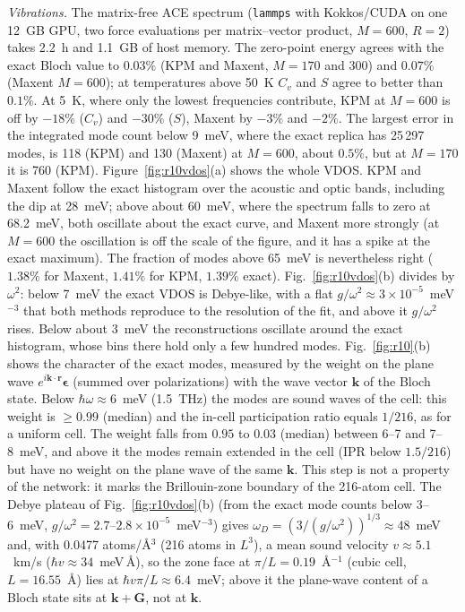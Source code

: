 \documentclass[reprint,nofootinbib,superscriptaddress,amsmath,amssymb,aps,prb,floatfix]{revtex4-2}
\begin{document}
\emph{Vibrations.} The matrix-free ACE spectrum (\texttt{lammps} with Kokkos/CUDA on one 12~GB GPU, two force evaluations per matrix--vector product, $M=600$, $R=2$) takes 2.2~h and 1.1~GB of host memory. The zero-point energy agrees with the exact Bloch value to $0.03\%$ (KPM and Maxent, $M=170$ and 300) and $0.07\%$ (Maxent $M=600$); at temperatures above 50~K $C_v$ and $S$ agree to better than $0.1\%$. At 5~K, where only the lowest frequencies contribute, KPM at $M=600$ is off by $-18\%$ ($C_v$) and $-30\%$ ($S$), Maxent by $-3\%$ and $-2\%$.
The largest error in the integrated mode count below 9~meV, where the exact replica has 25\,297 modes, is 118 (KPM) and 130 (Maxent) at $M=600$, about $0.5\%$, but at $M=170$ it is 760 (KPM).
Figure~\ref{fig:r10vdos}(a) shows the whole VDOS. KPM and Maxent follow the exact histogram over the acoustic and optic bands, including the dip at 28~meV; above about 60~meV, where the spectrum falls to zero at 68.2~meV, both oscillate about the exact curve, and Maxent more strongly (at $M=600$ the oscillation is off the scale of the figure, and it has a spike at the exact maximum). The fraction of modes above 65~meV is nevertheless right ($1.38\%$ for Maxent, $1.41\%$ for KPM, $1.39\%$ exact). Fig.~\ref{fig:r10vdos}(b) divides by $\omega^2$: below 7~meV the exact VDOS is Debye-like, with a flat $g/\omega^2\approx3\times10^{-5}$~meV$^{-3}$ that both methods reproduce to the resolution of the fit, and above it $g/\omega^2$ rises. Below about 3~meV the reconstructions oscillate around the exact histogram, whose bins there hold only a few hundred modes.
Fig.~\ref{fig:r10}(b) shows the character of the exact modes, measured by the weight on the plane wave $e^{i\mathbf k\cdot\mathbf r}\boldsymbol\epsilon$ (summed over polarizations) with the wave vector $\mathbf k$ of the Bloch state. Below $\hbar\omega\approx6$~meV (1.5~THz) the modes are sound waves of the cell: this weight is $\ge0.99$ (median) and the in-cell participation ratio equals $1/216$, as for a uniform cell. The weight falls from $0.95$ to $0.03$ (median) between 6--7 and 7--8~meV, and above it the modes remain extended in the cell (IPR below $1.5/216$) but have no weight on the plane wave of the same $\mathbf k$.
This step is not a property of the network: it marks the Brillouin-zone boundary of the 216-atom cell. The Debye plateau of Fig.~\ref{fig:r10vdos}(b) (from the exact mode counts below 3--6~meV, $g/\omega^2=2.7$--$2.8\times10^{-5}$~meV$^{-3}$) gives $\omega_D=(3/(g/\omega^2))^{1/3}\approx48$~meV and, with 0.0477 atoms/\AA$^3$ (216 atoms in $L^3$), a mean sound velocity $v\approx5.1$~km/s ($\hbar v\approx34$~meV\,\AA), so the zone face at $\pi/L=0.19$~\AA$^{-1}$ (cubic cell, $L=16.55$~\AA) lies at $\hbar v\pi/L\approx6.4$~meV; above it the plane-wave content of a Bloch state sits at $\mathbf k+\mathbf G$, not at $\mathbf k$.
\end{document}
